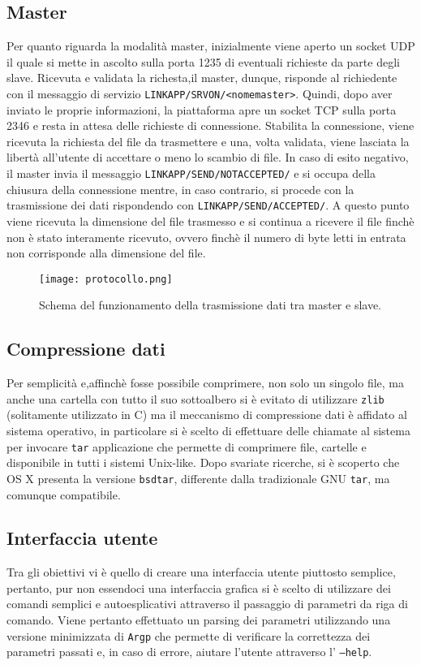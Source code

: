 \documentclass[11pt,fleqn]{book} %
\begin{document}
\subsection{Master}
Per quanto riguarda la modalità master, inizialmente viene aperto un socket UDP il quale si mette in ascolto sulla porta 1235 di eventuali richieste da parte degli slave. Ricevuta e validata la richesta,il master, dunque, risponde al richiedente con il messaggio di servizio \texttt{LINKAPP/SRVON/<nomemaster>}.
Quindi, dopo aver inviato le proprie informazioni, la piattaforma apre un socket TCP sulla porta 2346 e resta in attesa delle richieste di connessione.
Stabilita la connessione, viene ricevuta la richiesta del file da trasmettere e una, volta validata, viene lasciata la libertà all'utente di accettare o meno lo scambio di file. In caso di esito negativo, il master invia il messaggio  \texttt{LINKAPP/SEND/NOTACCEPTED/} e si occupa della chiusura della connessione mentre, in caso contrario, si procede con la trasmissione dei dati rispondendo con \texttt{LINKAPP/SEND/ACCEPTED/}.
A questo punto viene ricevuta la dimensione del file trasmesso e si continua a ricevere il file finchè non è stato interamente ricevuto, ovvero finchè il numero di byte letti in entrata non corrisponde alla dimensione del file.

\begin{figure}[h]
	\centering
    \texttt{[image: protocollo.png]}
    \caption{Schema del funzionamento della trasmissione dati tra master e slave.}
    \label{fig:awesome_image}
\end{figure}


\subsection{Compressione dati}\label{Compressione}
Per semplicità e,affinchè fosse possibile comprimere, non solo un singolo file, ma anche una cartella con tutto il suo sottoalbero si è evitato di utilizzare  \texttt{zlib} (solitamente utilizzato in C) ma il meccanismo di  compressione dati è affidato al sistema operativo, in particolare si è scelto di effettuare delle chiamate al sistema per invocare \texttt{tar} applicazione che permette di comprimere file, cartelle e disponibile in tutti i sistemi Unix-like.
Dopo svariate ricerche, si è scoperto che OS X presenta la versione \texttt{bsdtar}, differente dalla tradizionale GNU \texttt{tar}, ma comunque compatibile.

\subsection{Interfaccia utente}
Tra gli obiettivi vi è quello di creare una interfaccia utente piuttosto semplice, pertanto, pur non essendoci una interfaccia grafica si è scelto di utilizzare dei comandi semplici e autoesplicativi attraverso il passaggio di parametri da riga di comando.
Viene pertanto effettuato un parsing dei parametri utilizzando una versione minimizzata di \texttt{Argp} che permette di verificare la correttezza dei parametri passati e, in caso di errore, aiutare l'utente attraverso l' \texttt{---help}.
\end{document}
